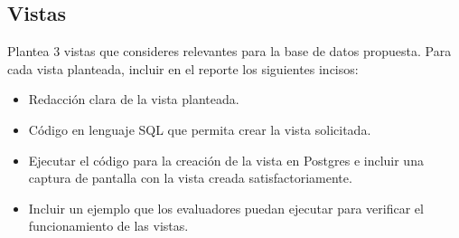 \subsection{Vistas}

Plantea 3 vistas que consideres relevantes para la base de datos propuesta. Para cada vista planteada, incluir en el reporte los siguientes incisos:
\begin{itemize}
    \item Redacción clara de la vista planteada.
    \item Código en lenguaje SQL que permita crear la vista solicitada.
    \item Ejecutar el código para la creación de la vista en Postgres e incluir una captura de pantalla
    con la vista creada satisfactoriamente.
    \item Incluir un ejemplo que los evaluadores puedan ejecutar para verificar el funcionamiento
    de las vistas.
\end{itemize}